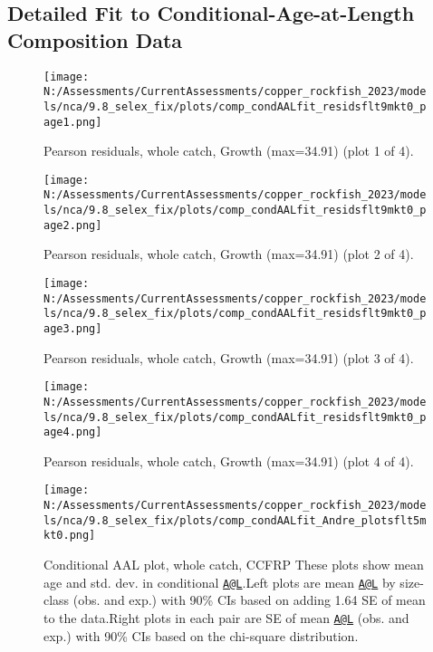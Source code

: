 \documentclass[11pt,
  english,
  letterpaper,
]{article}
\begin{document}
\newpage

\hypertarget{caal-data}{%
\subsection{Detailed Fit to Conditional-Age-at-Length Composition Data}\label{caal-data}}

\begin{figure}
\centering
\texttt{[image: N:/Assessments/CurrentAssessments/copper\_rockfish\_2023/models/nca/9.8\_selex\_fix/plots/comp\_condAALfit\_residsflt9mkt0\_page1.png]}
\caption{Pearson residuals, whole catch, Growth (max=34.91) (plot 1 of 4).\label{fig:comp_condAALfit_residsflt9mkt0_page1}}
\end{figure}

\begin{figure}
\centering
\texttt{[image: N:/Assessments/CurrentAssessments/copper\_rockfish\_2023/models/nca/9.8\_selex\_fix/plots/comp\_condAALfit\_residsflt9mkt0\_page2.png]}
\caption{Pearson residuals, whole catch, Growth (max=34.91) (plot 2 of 4).\label{fig:comp_condAALfit_residsflt9mkt0_page2}}
\end{figure}

\begin{figure}
\centering
\texttt{[image: N:/Assessments/CurrentAssessments/copper\_rockfish\_2023/models/nca/9.8\_selex\_fix/plots/comp\_condAALfit\_residsflt9mkt0\_page3.png]}
\caption{Pearson residuals, whole catch, Growth (max=34.91) (plot 3 of 4).\label{fig:comp_condAALfit_residsflt9mkt0_page3}}
\end{figure}

\begin{figure}
\centering
\texttt{[image: N:/Assessments/CurrentAssessments/copper\_rockfish\_2023/models/nca/9.8\_selex\_fix/plots/comp\_condAALfit\_residsflt9mkt0\_page4.png]}
\caption{Pearson residuals, whole catch, Growth (max=34.91) (plot 4 of 4).\label{fig:comp_condAALfit_residsflt9mkt0_page4}}
\end{figure}

\begin{figure}
\centering
\texttt{[image: N:/Assessments/CurrentAssessments/copper\_rockfish\_2023/models/nca/9.8\_selex\_fix/plots/comp\_condAALfit\_Andre\_plotsflt5mkt0.png]}
\caption{Conditional AAL plot, whole catch, CCFRP These plots show mean age and std. dev. in conditional \href{mailto:A@L}{\nolinkurl{A@L}}.Left plots are mean \href{mailto:A@L}{\nolinkurl{A@L}} by size-class (obs. and exp.) with 90\% CIs based on adding 1.64 SE of mean to the data.Right plots in each pair are SE of mean \href{mailto:A@L}{\nolinkurl{A@L}} (obs. and exp.) with 90\% CIs based on the chi-square distribution.\label{fig:comp_condAALfit_Andre_plotsflt5mkt0}}
\end{figure}
\end{document}
